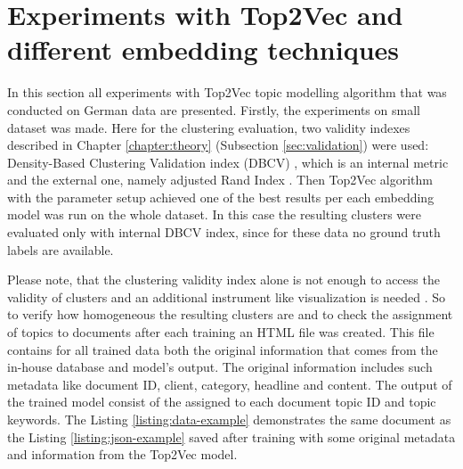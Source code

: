\documentclass[fontsize=12pt,a4paper,twoside,openany]{scrbook}
\begin{document}
\section{Experiments with Top2Vec and different embedding techniques}
\label{sec:exp}

In this section all experiments with Top2Vec topic modelling algorithm that was conducted on German data are presented. Firstly, the experiments on small dataset was made. Here for the clustering evaluation, two validity indexes described in Chapter \ref{chapter:theory} (Subsection \ref{sec:validation}) were used: Density-Based Clustering Validation index (DBCV) \parencite{Moulavi14}, which is an internal metric and the external one, namely adjusted Rand Index \parencite{Hubert85}. Then Top2Vec algorithm with the parameter setup achieved one of the best results per each embedding model was run on the whole dataset. In this case the resulting clusters were evaluated only with internal DBCV index, since for these data no ground truth labels are available.

Please note, that the clustering validity index alone is not enough to access the validity of clusters and an additional instrument like visualization is needed \parencite{Halkidi01b}. So to verify how homogeneous the resulting clusters are and to check the assignment of topics to documents after each training an HTML file was created. This file contains for all trained data both the original information that comes from the in-house database and model's output. The original information includes such metadata like document ID, client, category, headline and content. The output of the trained model consist of the assigned to each document topic ID and topic keywords. The Listing \ref{listing:data-example} demonstrates the same document as the Listing \ref{listing:json-example} saved after training with some original metadata and information from the Top2Vec model.
\end{document}
